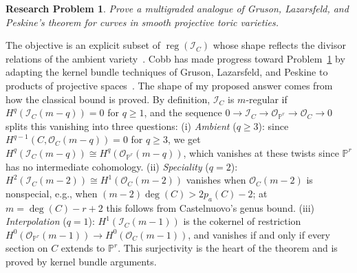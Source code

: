\documentclass[11pt,reqno]{amsart}
\newtheorem{problem}[lemma]{Research Problem}
\theoremstyle{remark}
\newcommand{\reg}{\operatorname{reg}}
\newcommand{\codim}{\operatorname{codim}}
\newcommand{\KK}{\mathbb{K}}
\newcommand{\PP}{\mathbb{P}}
\newcommand{\cI}{\mathcal{I}}
\newcommand{\cO}{\mathcal{O}}
\begin{document}

 \begin{problem}\label{prob:GLP}
 	Prove a multigraded analogue of Gruson, Lazarsfeld, and Peskine's theorem for curves in smooth projective toric varieties.
\end{problem}

The objective is an explicit subset of $\reg(\cI_C)$ whose shape reflects the divisor relations of the ambient variety~\cite{maclaganSmith04}. Cobb has made progress toward Problem~\ref{prob:GLP} by adapting the kernel bundle techniques of Gruson, Lazarsfeld, and Peskine to products of projective spaces~\cite{cobb24}. The shape of my proposed answer comes from how the classical bound is proved. By definition, $\cI_C$ is $m$-regular if $H^q(\cI_C(m-q))=0$ for $q\geq1$, and the sequence $0\to\cI_C\to\cO_{\PP^r}\to\cO_C\to0$ splits this vanishing into three questions: (i) \emph{Ambient} ($q\geq3$): since $H^{q-1}(C,\cO_{C}(m-q))=0$ for $q\geq3$, we get $H^q(\cI_{C}(m-q)) \cong H^q(\cO_{\PP^r}(m-q))$, which vanishes at these twists since $\PP^r$ has no intermediate cohomology. (ii) \emph{Speciality} ($q=2$): $H^2(\cI_C(m-2))\cong H^1(\cO_C(m-2))$ vanishes when $\cO_{C}(m-2)$ is nonspecial, e.g., when $(m-2)\deg(C)>2p_a(C)-2$; at $m=\deg(C)-r+2$ this follows from Castelnuovo's genus bound. (iii) \emph{Interpolation} ($q=1$): $H^1(\cI_{C}(m-1))$ is the cokernel of restriction $H^0(\cO_{\PP^r}(m-1))\to H^0(\cO_C(m-1))$, and vanishes if and only if every section on $C$ extends to $\PP^r$. This surjectivity is the heart of the theorem and is proved by kernel bundle arguments. 
\end{document}
